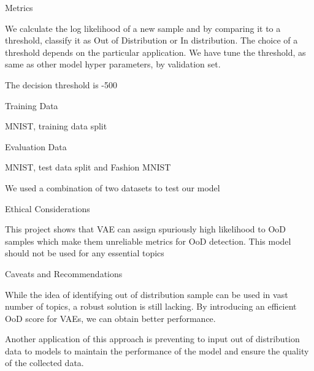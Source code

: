\documentclass{article}
\begin{document}
\begin{adjustwidth}{-100pt}{-100pt}
\begin{singlespace}
\begin{tcolorbox}[title=\textbf{Model Card},
    breakable, sharp corners, boxrule=0.7pt]
{\begin{mcsection}{Metrics}
    \item We calculate the log likelihood of a new sample and by comparing it to a threshold, classify it as Out of Distribution or In distribution. The choice of a threshold depends on the particular application. We have tune the threshold, as same as other model hyper parameters, by validation set. 
    \item The decision threshold is -500

\end{mcsection}

\begin{mcsection}{Training Data}
    \item MNIST, training data split
\end{mcsection}



\begin{mcsection}{Evaluation Data}
    \item MNIST, test data split and Fashion MNIST
    \item We used a combination of two datasets to test our model
\end{mcsection}

\begin{mcsection}{Ethical Considerations}
    \item This project shows that VAE can assign spuriously high likelihood to OoD samples which make them unreliable metrics for OoD detection. This model should not be used for any essential topics
\end{mcsection}

\begin{mcsection}{Caveats and Recommendations}
    \item While the idea of identifying out of distribution sample can be used in vast number of topics, a robust solution is still lacking. By introducing an efficient OoD score for VAEs, we can obtain better performance.
    \item Another application of this approach is preventing to input out of distribution data to models to maintain the performance of the model and ensure the quality of the collected data.
\end{mcsection}

}
\end{tcolorbox}
\end{singlespace}
\end{adjustwidth}
\end{document}

